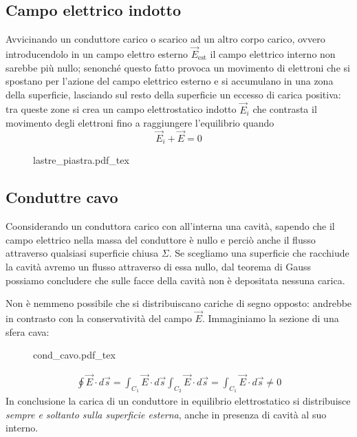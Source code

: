 \documentclass[x11names]{report}
\newcommand{\incfig}[1]{%
	{#1.pdf_tex}
}
\begin{document}
\subsection{Campo elettrico indotto}
Avvicinando un conduttore carico o scarico ad un altro corpo carico, ovvero introducendolo in un campo elettro esterno \(\vec{E}_\text{est}\) il campo elettrico interno non sarebbe più nullo; senonché questo fatto provoca un movimento di elettroni che si spostano per l'azione del campo elettrico esterno e si accumulano in una zona della superficie, lasciando sul resto della superficie un eccesso di carica positiva: tra queste zone si crea un campo elettrostatico indotto \(\vec{E}_i\) che contrasta il movimento degli elettroni fino a raggiungere l'equilibrio quando
\[
\vec{E}_i + \vec{E} = 0
	\]
\begin{figure}[H]
	\centering
	\incfig{lastre_piastra}
\end{figure}

\subsection{Conduttre cavo}
Coonsiderando un conduttora carico con all'interna una cavità, sapendo che il campo elettrico nella massa del conduttore è nullo e perciò anche il flusso attraverso qualsiasi superficie chiusa \(\Sigma\). Se scegliamo una superficie che racchiude la cavità avremo un flusso attraverso di essa nullo, dal teorema di Gauss possiamo concludere che sulle facce della cavità non è depositata nessuna carica.

Non è nemmeno possibile che si distribuiscano cariche di segno opposto: andrebbe in contrasto con la  conservatività del campo \(\vec{E}\). Immaginiamo la sezione di una sfera cava:
\begin{figure}[H]
	\centering
	\incfig{cond_cavo}
\end{figure}
\begin{gather*}
	\oint \vec{E} \cdot d\vec{s} = \int_{C_1} \vec{E} \cdot d\vec{s} \int_{C_2} \vec{E} \cdot d\vec{s} = \int_{C_1} \vec{E} \cdot d\vec{s} \neq 0
\end{gather*}
In conclusione la carica di un conduttore in equilibrio elettrostatico si distribuisce \textit{sempre e soltanto sulla superficie esterna}, anche in presenza di cavità al suo interno. \\
\end{document}
